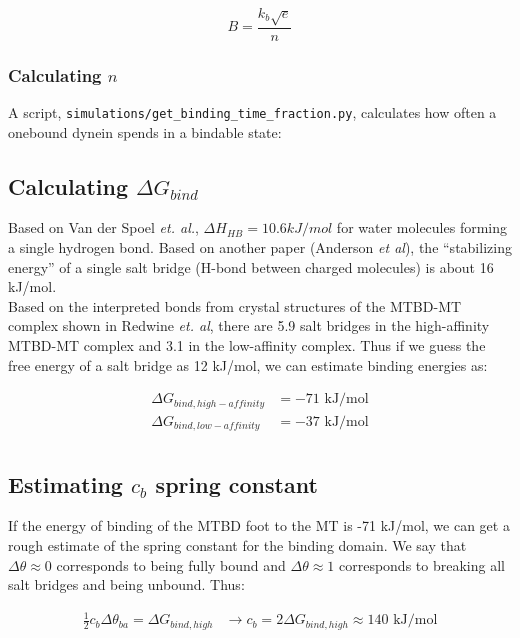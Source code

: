 \documentclass[10pt]{article} %
\begin{document}
\begin{equation*}
  B = \frac{k_{b}\sqrt{e}}{n}
\end{equation*}

\subsubsection{Calculating $n$}
A script, \verb|simulations/get_binding_time_fraction.py|, calculates how often
a onebound dynein spends in a bindable state:



\subsection{Calculating $\Delta G_{bind}$}
Based on Van der Spoel \textit{et. al.}, $\Delta H_{HB} = 10.6kJ/mol$ for water molecules forming a single hydrogen bond. Based on another paper (Anderson \textit{et al}), the
``stabilizing energy'' of a single salt bridge (H-bond between charged molecules) is about 16 kJ/mol.\\

Based on the interpreted bonds from crystal structures of the MTBD-MT complex shown in Redwine \textit{et. al}, there are 5.9 salt bridges in the high-affinity MTBD-MT
complex and 3.1 in the low-affinity complex. Thus if we guess the free energy of a salt bridge as 12 kJ/mol, we can estimate binding energies as:

\begin{align*}
  \Delta G_{bind, high-affinity} &= -71 \mbox{ kJ/mol}\\
  \Delta G_{bind, low-affinity} &= -37 \mbox{ kJ/mol}\\
\end{align*}

\subsection{Estimating $c_b$ spring constant}
If the energy of binding of the MTBD foot to the MT is -71 kJ/mol, we can get a rough estimate of the spring constant for the binding domain. We say that
$\Delta \theta \approx 0$ corresponds to being fully bound and $\Delta \theta \approx 1$ corresponds to breaking all salt bridges and being unbound. Thus:

\begin{align*}
  \frac 12 c_b \Delta \theta_{ba} = \Delta G_{bind, high} &\rightarrow c_b = 2\Delta G_{bind, high} \approx 140 \mbox{ kJ/mol}\\
\end{align*}
\end{document}
